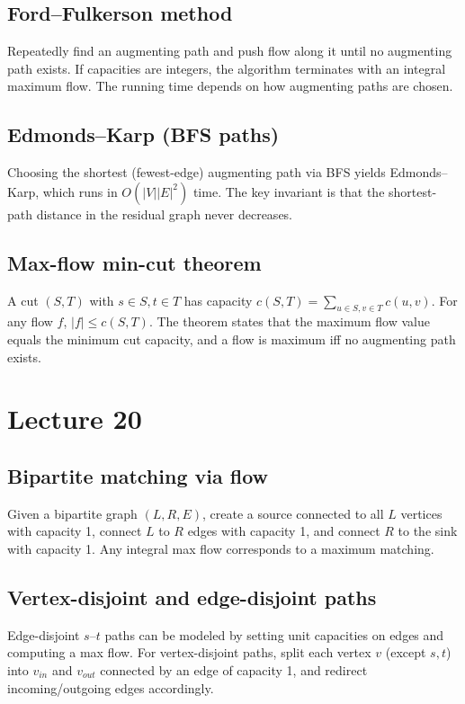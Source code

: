 \documentclass[11pt]{article}
\begin{document}
{{{{\subsection*{Ford--Fulkerson method}
Repeatedly find an augmenting path and push flow along it until no augmenting path exists. If
capacities are integers, the algorithm terminates with an integral maximum flow. The running time
depends on how augmenting paths are chosen.

\subsection*{Edmonds--Karp (BFS paths)}
Choosing the shortest (fewest-edge) augmenting path via BFS yields Edmonds--Karp, which runs in
$O(|V||E|^2)$ time. The key invariant is that the shortest-path distance in the residual graph
never decreases.

\subsection*{Max-flow min-cut theorem}
A cut $(S,T)$ with $s \in S, t \in T$ has capacity $c(S,T)=\sum_{u\in S, v\in T} c(u,v)$. For any
flow $f$, $|f| \le c(S,T)$. The theorem states that the maximum flow value equals the minimum cut
capacity, and a flow is maximum iff no augmenting path exists.

\section{Lecture 20}

\subsection*{Bipartite matching via flow}
Given a bipartite graph $(L,R,E)$, create a source connected to all $L$ vertices with capacity 1,
connect $L$ to $R$ edges with capacity 1, and connect $R$ to the sink with capacity 1. Any
integral max flow corresponds to a maximum matching.

\subsection*{Vertex-disjoint and edge-disjoint paths}
Edge-disjoint $s$--$t$ paths can be modeled by setting unit capacities on edges and computing a
max flow. For vertex-disjoint paths, split each vertex $v$ (except $s,t$) into $v_{in}$ and
$v_{out}$ connected by an edge of capacity 1, and redirect incoming/outgoing edges accordingly.

}}}}
\end{document}
